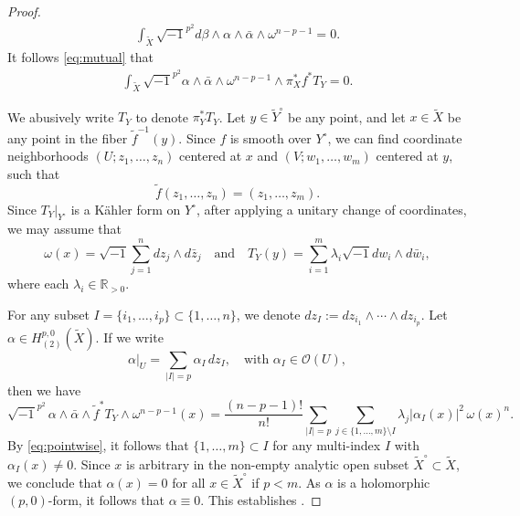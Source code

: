 \documentclass[11pt,a4paper,english]{smfart}
\theoremstyle{plain}
\theoremstyle{definition}
\theoremstyle{plain}
\begin{document}
\begin{proof}
		\begin{align*} 
		\int_{\widetilde{X} }  	\sqrt{-1}^{p^2}	 d\beta \wedge \alpha\wedge \bar{\alpha}\wedge \omega^{n-p-1}=0.
		\end{align*}  
		It follows \eqref{eq:mutual} that 
\begin{align}\label{eq:pointwise}
\int_{\widetilde{X}}  	\sqrt{-1}^{p^2}	  \alpha\wedge \bar{\alpha} \wedge \omega^{n-p-1}\wedge \pi_X^*f^*T_Y=0. 
\end{align}

\medspace

We abusively write \( T_Y \) to denote \( \pi_Y^*T_Y \). Let \( y \in \widetilde{Y}^\circ \) be any point, and let \( x \in \widetilde{X} \) be any point in the fiber \( \tilde{f}^{-1}(y) \). Since \( f \) is smooth over \( Y^\circ \), we can find coordinate neighborhoods \( (U; z_1, \ldots, z_n) \) centered at \( x \) and \( (V; w_1, \ldots, w_m) \) centered at \( y \), such that 
\[
\tilde{f}(z_1, \ldots, z_n) = (z_1, \ldots, z_m).
\]
Since \( T_Y|_{Y^\circ} \) is a Kähler form on \( Y^\circ \), after applying a unitary change of coordinates, we may assume that 
\[
\omega(x) = \sqrt{-1} \sum_{j=1}^n dz_j \wedge d\bar{z}_j \quad \text{and} \quad T_Y(y) = \sum_{i=1}^m \lambda_i \sqrt{-1} dw_i \wedge d\bar{w}_i,
\]
where each \( \lambda_i \in \mathbb{R}_{>0} \).
	
	
	For any subset \( I = \{i_1, \ldots, i_p\} \subset \{1, \ldots, n\} \), we denote \( dz_I := dz_{i_1} \wedge \cdots \wedge dz_{i_p} \). Let \( \alpha \in H^{p,0}_{(2)}(\widetilde{X}) \). If we write
	\[
	\alpha|_U = \sum_{|I| = p} \alpha_I \, dz_I, \quad \text{with } \alpha_I \in \mathcal{O}(U),
	\]
	then we have
	\[
	\sqrt{-1}^{p^2} \, \alpha \wedge \bar{\alpha} \wedge \tilde{f}^*T_Y \wedge \omega^{n-p-1}(x)
	= \frac{(n - p - 1)!}{n!}\sum_{|I|=p} \sum_{j \in \{1, \ldots, m\} \setminus I} \lambda_j |\alpha_I(x)|^2 \, \omega(x)^n.
	\]
	By \eqref{eq:pointwise}, it follows that \( \{1, \ldots, m\} \subset I \) for any multi-index \( I \) with \( \alpha_I(x) \neq 0 \). Since \( x \) is arbitrary in the non-empty analytic open subset \( \widetilde{X}^\circ \subset \widetilde{X} \), we conclude that \( \alpha(x) = 0 \) for all \( x \in \widetilde{X}^\circ \) if $p<m$. As \( \alpha \) is a holomorphic \((p,0)\)-form, it follows that \( \alpha \equiv 0 \). This establishes .
	

\end{proof}
\end{document}
